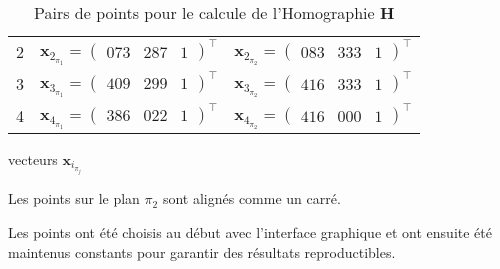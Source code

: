 \documentclass[../CSC_5RO17_TA_TP1.tex]{subfiles}
\begin{document}
\begin{table}[H]
\begin{subtable}[H]{0.475\textwidth}
\begin{tabular}{cll}
            2 & $\mathbf{x}_{2_{\pi_1}} = \begin{pmatrix}073 & 287 & 1\end{pmatrix}^{\intercal}$ & $\mathbf{x}_{2_{\pi_2}} = \begin{pmatrix}083 & 333 & 1\end{pmatrix}^{\intercal}$\\
            3 & $\mathbf{x}_{3_{\pi_1}} = \begin{pmatrix}409 & 299 & 1\end{pmatrix}^{\intercal}$ & $\mathbf{x}_{3_{\pi_2}} = \begin{pmatrix}416 & 333 & 1\end{pmatrix}^{\intercal}$\\
            4 & $\mathbf{x}_{4_{\pi_1}} = \begin{pmatrix}386 & 022 & 1\end{pmatrix}^{\intercal}$ & $\mathbf{x}_{4_{\pi_2}} = \begin{pmatrix}416 & 000 & 1\end{pmatrix}^{\intercal}$\\
            \hline
        \end{tabular}
        \caption{vecteurs $\mathbf{x}_{i_{\pi_{j}}}$}
        \label{tab_homography_coordinates}
    \end{subtable}
        \caption{Pairs de points pour le calcule de l'Homographie $\mathbf{H}$}
    \end{table}
\begin{remark}
    Les points sur le plan $\pi_2$ sont alignés comme un carré.
\end{remark}
\noindent Les points ont été choisis au début avec l'interface graphique et ont ensuite été maintenus constants pour garantir des résultats reproductibles.
\end{document}
